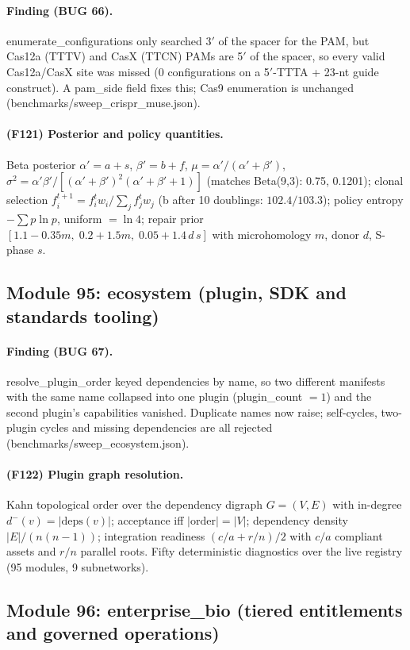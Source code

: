 \paragraph{Finding (BUG 66).} enumerate\_configurations only searched 3$'$ of the spacer for the PAM, but Cas12a (TTTV) and CasX (TTCN) PAMs are 5$'$ of the spacer, so every valid Cas12a/CasX site was missed (0 configurations on a 5$'$-TTTA + 23-nt guide construct). A pam\_side field fixes this; Cas9 enumeration is unchanged (benchmarks/sweep\_crispr\_muse.json).
\paragraph{(F121) Posterior and policy quantities.} Beta posterior $\alpha'=a+s$, $\beta'=b+f$, $\mu=\alpha'/(\alpha'+\beta')$, $\sigma^2=\alpha'\beta'/[(\alpha'+\beta')^2(\alpha'+\beta'+1)]$ (matches Beta(9,3): 0.75, 0.1201); clonal selection $f_i^{t+1}=f_i^t w_i/\sum_j f_j^t w_j$ (b after 10 doublings: $102.4/103.3$); policy entropy $-\sum p\ln p$, uniform $=\ln 4$; repair prior $[1.1-0.35m,\;0.2+1.5m,\;0.05+1.4\,d\,s]$ with microhomology $m$, donor $d$, S-phase $s$.
\subsection{Module 95: ecosystem (plugin, SDK and standards tooling)}
\paragraph{Finding (BUG 67).} resolve\_plugin\_order keyed dependencies by name, so two different manifests with the same name collapsed into one plugin (plugin\_count $=1$) and the second plugin's capabilities vanished. Duplicate names now raise; self-cycles, two-plugin cycles and missing dependencies are all rejected (benchmarks/sweep\_ecosystem.json).
\paragraph{(F122) Plugin graph resolution.} Kahn topological order over the dependency digraph $G=(V,E)$ with in-degree $d^-(v)=|\mathrm{deps}(v)|$; acceptance iff $|\mathrm{order}|=|V|$; dependency density $|E|/(n(n-1))$; integration readiness $(c/a+r/n)/2$ with $c/a$ compliant assets and $r/n$ parallel roots. Fifty deterministic diagnostics over the live registry (95 modules, 9 subnetworks).
\subsection{Module 96: enterprise\_bio (tiered entitlements and governed operations)}
